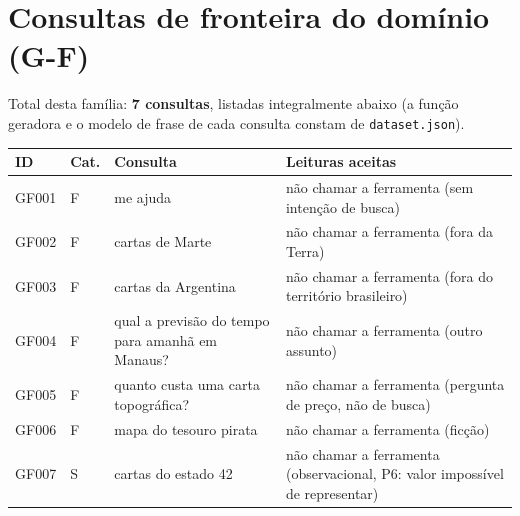 \section{Consultas de fronteira do dom\'inio (G-F)}

Total desta fam\'ilia: \textbf{7 consultas}, listadas integralmente abaixo (a fun\c{c}\~ao geradora e o modelo de frase de cada consulta constam de \texttt{dataset.json}).

{\footnotesize
\begin{longtable}{|p{1.1cm}|p{1.3cm}|p{5.4cm}|p{6.3cm}|}
\hline
\textbf{ID} & \textbf{Cat.} & \textbf{Consulta} & \textbf{Leituras aceitas} \\ \hline
\endhead
GF001 & F & me ajuda & não chamar a ferramenta (sem intenção de busca) \\ \hline
GF002 & F & cartas de Marte & não chamar a ferramenta (fora da Terra) \\ \hline
GF003 & F & cartas da Argentina & não chamar a ferramenta (fora do território brasileiro) \\ \hline
GF004 & F & qual a previsão do tempo para amanhã em Manaus? & não chamar a ferramenta (outro assunto) \\ \hline
GF005 & F & quanto custa uma carta topográfica? & não chamar a ferramenta (pergunta de preço, não de busca) \\ \hline
GF006 & F & mapa do tesouro pirata & não chamar a ferramenta (ficção) \\ \hline
GF007 & S & cartas do estado 42 & não chamar a ferramenta (observacional, P6: valor impossível de representar) \\ \hline
\end{longtable}
\addtocounter{table}{-1}
}

